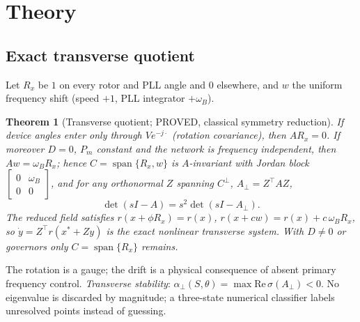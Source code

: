\documentclass[10pt,a4paper]{article}
\newtheorem{theorem}{Theorem}
\theoremstyle{definition}
\newcommand{\aperp}{\alpha_\perp}
\newcommand{\Aperp}{A_\perp}
\DeclareMathOperator{\spanop}{span}
\newcommand{\status}[1]{\textsf{\small #1}}
\begin{document}
\section{Theory}\label{sec:theory}

\subsection{Exact transverse quotient}
Let $R_x$ be $1$ on every rotor and PLL angle and $0$ elsewhere, and $w$ the uniform frequency shift
(speed $+1$, PLL integrator $+\omega_B$).
\begin{theorem}[Transverse quotient; \status{PROVED}, classical symmetry reduction]
If device angles enter only through $Ve^{-j\cdot}$ (rotation covariance), then $AR_x=0$. If moreover
$D=0$, $P_m$ constant and the network is frequency independent, then $Aw=\omega_BR_x$; hence
$C=\spanop\{R_x,w\}$ is $A$-invariant with Jordan block $\left[\begin{smallmatrix}0&\omega_B\\0&0\end{smallmatrix}\right]$,
and for any orthonormal $Z$ spanning $C^\perp$, $\Aperp=Z^\top AZ$,
\begin{equation}\det(sI-A)=s^2\det(sI-\Aperp).\end{equation}
The reduced field satisfies $r(x+\phi R_x)=r(x)$, $r(x+cw)=r(x)+c\,\omega_BR_x$, so
$\dot y=Z^\top r(x^*+Zy)$ is the exact nonlinear transverse system. With $D\ne0$ or governors only
$C=\spanop\{R_x\}$ remains.
\end{theorem}
The rotation is a gauge; the drift is a physical consequence of absent primary frequency control.
\emph{Transverse stability}: $\aperp(S,\theta)=\max\mathrm{Re}\,\sigma(\Aperp)<0$. No eigenvalue is
discarded by magnitude; a three-state numerical classifier labels unresolved points instead of guessing.
\end{document}
